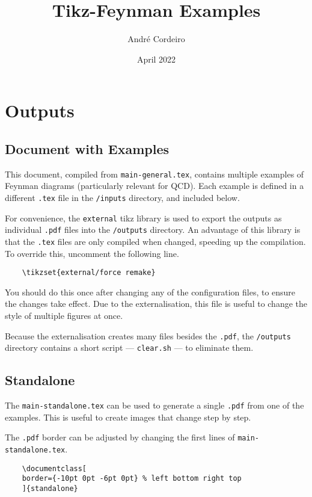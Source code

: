 \documentclass[12pt]{article}
\begin{document}
\title{Tikz-Feynman Examples}
\author{André Cordeiro}
\date{April 2022}
\maketitle

\section{Outputs}

\subsection{Document with Examples}

This document, compiled from \texttt{main-general.tex}, contains multiple examples of Feynman diagrams (particularly relevant for QCD). Each example is defined in a different \texttt{.tex} file in the \texttt{/inputs} directory, and included below.

For convenience, the \texttt{external} tikz library is used to export the outputs as individual \texttt{.pdf} files into the \texttt{/outputs} directory. An advantage of this library is that the \texttt{.tex} files are only compiled when changed, speeding up the compilation. To override this, uncomment the following line.
\begin{verbatim}
	\tikzset{external/force remake}	
\end{verbatim}

You should do this once after changing any of the configuration files, to ensure the changes take effect. Due to the externalisation, this file is useful to change the style of multiple figures at once.

Because the externalisation creates many files besides the \texttt{.pdf}, the \texttt{/outputs} directory contains a short script --- \texttt{clear.sh} --- to eliminate them.



\subsection{Standalone}

The \texttt{main-standalone.tex} can be used to generate a single \texttt{.pdf} from one of the examples. This is useful to create images that change step by step.

The \texttt{.pdf} border can be adjusted by changing the first lines of \texttt{main-standalone.tex}.
\begin{verbatim}
	\documentclass[
	border={-10pt 0pt -6pt 0pt} % left bottom right top
	]{standalone} 
\end{verbatim}
\end{document}
